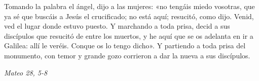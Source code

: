 \documentclass[../../devocionario.tex]{subfiles}
\begin{document}
    Tomando la palabra el ángel, dijo a las mujeres: «no tengáis miedo vosotras, que ya sé que buscáis a Jesús el crucificado; 
    no está aquí; resucitó, como dijo. Venid, ved el lugar donde estuvo puesto. Y marchando a toda prisa, 
    decid a sus discípulos que resucitó de entre los muertos, y he aquí que se os adelanta en ir a Galilea: allí le veréis. 
    Conque os lo tengo dicho». Y partiendo a toda prisa del monumento, con temor y grande gozo corrieron a dar la nueva a sus discípulos. 

    \begin{flushright}
        \textit{Mateo 28, 5-8}
    \end{flushright}
\end{document}
